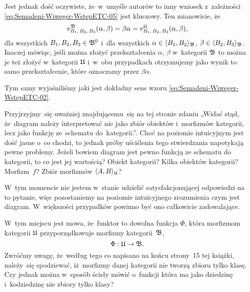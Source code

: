 \documentclass[a4paper,11pt]{article}
\begin{document}
Jest jednak dość oczywiste, że~w~umyśle autorów to inny wniosek z~zależności
\eqref{eq:Semadeni-Wiweger-WstepETC-05} jest kluczowy. Ten mianowicie, że
\begin{equation}
  \label{eq:Semadeni-Wiweger-WstepETC-07}
  v_{ B_{ 1 }, \, B_{ 2 }, \, B_{ 3 } }^{ \mathfrak{B} }( \alpha, \beta ) =
  \beta \alpha =
  v_{ B_{ 1 }, \, B_{ 2 }, \, B_{ 3 } }^{ \mathfrak{U} }( \alpha, \beta ),
\end{equation}
dla wszystkich $B_{ 1 }, B_{ 2 }, B_{ 3 } \in \mathfrak{B}^{ 0 }$ i~dla wszystkich
$\alpha \in \langle B_{ 1 }, B_{ 2 } \rangle_{ \mathfrak{B} }$, $\beta \in \langle B_{ 2 }, B_{ 3 } \rangle_{ \mathfrak{B} }$.
Inaczej mówiąc, jeśli można złożyć przekształcenia $\alpha$, $\beta$ w~kategorii
$\mathfrak{B}$ to można je też złożyć w~kategorii $\mathfrak{U}$ i~w~obu przypadkach
otrzymujemy jako wynik to samo przekształcenie, które oznaczamy przez
$\beta \alpha$.

Tym samy wyjaśniliśmy jaki jest dokładny sens wzoru
\eqref{eq:Semadeni-Wiweger-WstepETC-02}.

\vspace{\spaceFour}





\noindent
{} Przyjrzyjmy~się uważniej znajdującemu~się na tej stronie zdaniu
„Widać stąd, że~diagram należy interpretować nie jako zbiór obiektów
i~morfizmów kategorii, lecz jako funkcję ze~schematu do~kategorii.”. Choć na
poziomie intuicyjnym jest dość jasne o~co chodzi, to jednak próby uściślenia
tego stwierdzania napotykają pewne problemy. Jeżeli bowiem diagram jest
pewno funkcją ze schematu do kategorii, to co jest jej wartością? Obiekt
kategorii? Kilka obiektów kategorii? Morfizm~$f$? Zbiór morfizmów
$\langle A, B \rangle_{ \mathfrak{U} }$?

W~tym momencie nie jestem w~stanie udzielić satysfakcjonującej odpowiedzi na
to pytanie, więc pozostaniemy na poziomie intuicyjnego zrozumienia czym jest
diagram. W~większości przypadków powinno być ono całkowicie zadowalające.

\vspace{\spaceFour}





\noindent
{} W~tym miejscu jest mowa, że~funktor to dowolna funkcja $\Phi$, która
morfizmom kategorii $\mathfrak{U}$ przyporządkowuje morfizmy kategorii~$\mathfrak{B}$,
\begin{equation}
  \label{eq:Semadeni-Wiweger-WstepETC-08}
  \Phi : \mathfrak{U} \to \mathfrak{B}.
\end{equation}
Zwróćmy uwagę, że~według tego co napisano na końcu strony~15 tej książki,
należy~się spodziewać, iż~morfizmy danej kategorii nie tworzą zbioru tylko
klasę. Czy jednak można w~sposób ścisły mówić o~funkcji która ma jako
dziedzinę i~kodziedzinę nie zbiory tylko klasy?
\end{document}
